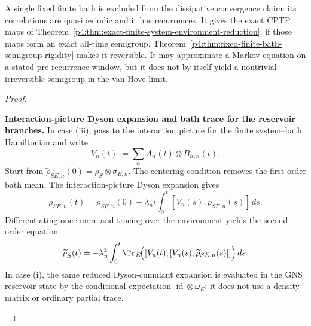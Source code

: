 \documentclass[12pt,a4paper]{article}
\begin{document}
\begin{theorem}
A single fixed finite bath is excluded from the dissipative convergence
claim: its correlations are quasiperiodic and it has recurrences.  It gives
the exact CPTP maps of
Theorem~\ref{p4:thm:exact-finite-system-environment-reduction}; if those maps
form an exact all-time semigroup,
Theorem~\ref{p4:thm:fixed-finite-bath-semigroup-rigidity} makes it reversible.
It may
approximate a Markov equation on a stated pre-recurrence window, but it does
not by itself yield a nontrivial irreversible semigroup in the van Hove
limit.
\end{theorem}


\begin{proof}
\begin{proofsteps}

\item \textbf{Interaction-picture Dyson expansion and bath trace for the
reservoir branches.}
In case (iii), pass to the interaction picture for the finite
system--bath Hamiltonian and write
\[
V_n(t):=\sum_\alpha A_\alpha(t)\otimes B_{\alpha,n}(t).
\]
Start from
\(\widetilde\rho_{SE,n}(0)=\rho_S\otimes\sigma_{E,n}\).
The centering condition removes the first-order bath mean.  The
interaction-picture Dyson expansion gives
\[
\widetilde\rho_{SE,n}(t)
=
\widetilde\rho_{SE,n}(0)
-\lambda_n i\int_0^t [V_n(s),\widetilde\rho_{SE,n}(s)]\,ds.
\]
Differentiating once more and tracing over the environment yields the second-order equation
\[
\dot{\widetilde\rho}_S(t)
=
-\lambda_n^2
\int_0^t
\Tr_E\!\Bigl(
[V_n(t),[V_n(s),\widetilde\rho_{SE,n}(s)]]
\Bigr)\,ds.
\]
In case (i), the same reduced Dyson-cumulant expansion is evaluated in the
GNS reservoir state by the conditional expectation
\(\operatorname{id}\otimes\omega_E\); it does not use a density matrix or
ordinary partial trace.


\end{proofsteps}
\end{proof}
\end{document}
